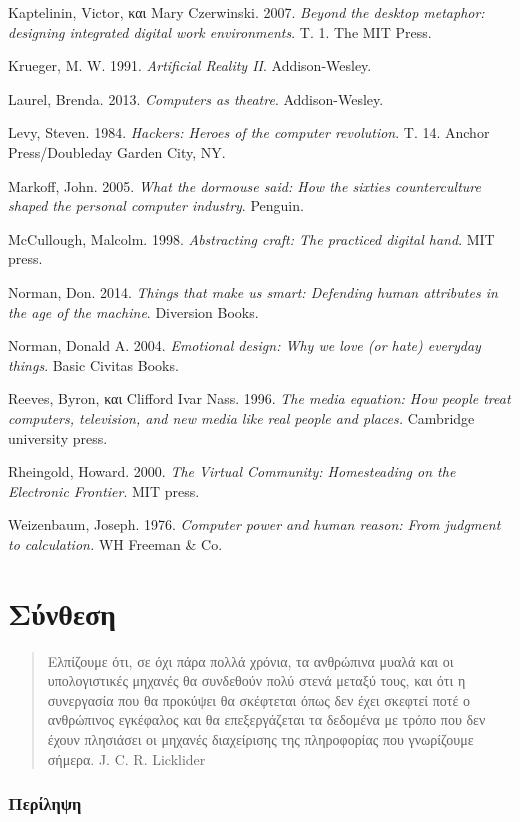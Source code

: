 \documentclass[
]{article}
\begin{document}
Kaptelinin, Victor, και Mary Czerwinski. 2007. \emph{Beyond the desktop
metaphor: designing integrated digital work environments}. Τ. 1. The MIT
Press.

Krueger, M. W. 1991. \emph{Artificial Reality II}. Addison-Wesley.

Laurel, Brenda. 2013. \emph{Computers as theatre}. Addison-Wesley.

Levy, Steven. 1984. \emph{Hackers: Heroes of the computer revolution}.
Τ. 14. Anchor Press/Doubleday Garden City, NY.

Markoff, John. 2005. \emph{What the dormouse said: How the sixties
counterculture shaped the personal computer industry}. Penguin.

McCullough, Malcolm. 1998. \emph{Abstracting craft: The practiced
digital hand}. MIT press.

Norman, Don. 2014. \emph{Things that make us smart: Defending human
attributes in the age of the machine}. Diversion Books.

Norman, Donald A. 2004. \emph{Emotional design: Why we love (or hate)
everyday things}. Basic Civitas Books.

Reeves, Byron, και Clifford Ivar Nass. 1996. \emph{The media equation:
How people treat computers, television, and new media like real people
and places.} Cambridge university press.

Rheingold, Howard. 2000. \emph{The Virtual Community: Homesteading on
the Electronic Frontier}. MIT press.

Weizenbaum, Joseph. 1976. \emph{Computer power and human reason: From
judgment to calculation.} WH Freeman \& Co.

\hypertarget{ux3c3ux3cdux3bdux3b8ux3b5ux3c3ux3b7}{%
\section{Σύνθεση}\label{ux3c3ux3cdux3bdux3b8ux3b5ux3c3ux3b7}}

\begin{quote}
Ελπίζουμε ότι, σε όχι πάρα πολλά χρόνια, τα ανθρώπινα μυαλά και οι
υπολογιστικές μηχανές θα συνδεθούν πολύ στενά μεταξύ τους, και ότι η
συνεργασία που θα προκύψει θα σκέφτεται όπως δεν έχει σκεφτεί ποτέ ο
ανθρώπινος εγκέφαλος και θα επεξεργάζεται τα δεδομένα με τρόπο που δεν
έχουν πλησιάσει οι μηχανές διαχείρισης της πληροφορίας που γνωρίζουμε
σήμερα. J. C. R. Licklider
\end{quote}

\hypertarget{ux3c0ux3b5ux3c1ux3afux3bbux3b7ux3c8ux3b7}{%
\subsubsection{Περίληψη}\label{ux3c0ux3b5ux3c1ux3afux3bbux3b7ux3c8ux3b7}}
\end{document}
